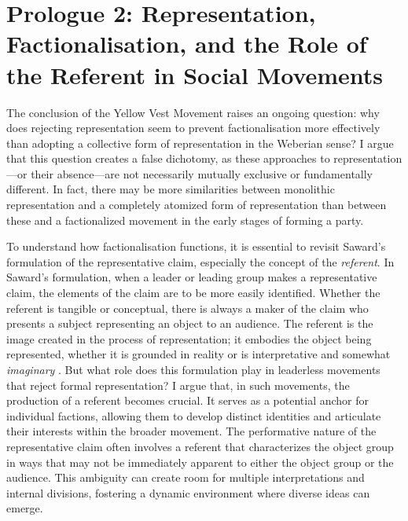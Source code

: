 \section{Prologue 2: Representation, Factionalisation, and the Role of the Referent in Social Movements}

The conclusion of the Yellow Vest Movement raises an ongoing question: why does rejecting representation seem to prevent factionalisation more effectively than adopting a collective form of representation in the Weberian sense? I argue that this question creates a false dichotomy, as these approaches to representation—or their absence—are not necessarily mutually exclusive or fundamentally different. In fact, there may be more similarities between monolithic representation and a completely atomized form of representation than between these and a factionalized movement in the early stages of forming a party.

To understand how factionalisation functions, it is essential to revisit Saward's formulation of the representative claim, especially the concept of the \textit{referent}. In Saward's formulation, when a leader or leading group makes a representative claim, the elements of the claim are to be more easily identified. Whether the referent is tangible or conceptual, there is always a maker of the claim who presents a subject representing an object to an audience. The referent is the image created in the process of representation; it embodies the object being represented, whether it is grounded in reality or is interpretative and somewhat \textit{imaginary} \parencite[see 53-55]{saward2010}. But what role does this formulation play in leaderless movements that reject formal representation? I argue that, in such movements, the production of a referent becomes crucial. It serves as a potential anchor for individual factions, allowing them to develop distinct identities and articulate their interests within the broader movement. The performative nature of the representative claim often involves a referent that characterizes the object group in ways that may not be immediately apparent to either the object group or the audience. This ambiguity can create room for multiple interpretations and internal divisions, fostering a dynamic environment where diverse ideas can emerge.

